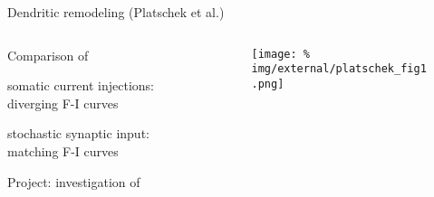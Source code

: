 
\begin{frame}{Dendritic remodeling (Platschek et al.)}
  \begin{columns}
    \begin{column}{.425\textwidth}
      \minipage[c][0.65\textheight][s]{\columnwidth}
      \vspace{0.05\textheight}

        Comparison of 

        \vfill

        somatic current injections: diverging F-I curves

        \vfill 

        stochastic synaptic input: matching F-I curves

        \vfill
        
        Project: investigation of
      
      
      
      \endminipage      
    \end{column}
    \begin{column}{.575\textwidth}
      
      \parbox[c][0.9\textheight][c]{\columnwidth}{
        \begin{figure}
          \centering
          \texttt{[image: \%
            img/external/platschek\_fig1.png]} %
        \end{figure}}
        
    \end{column}
  \end{columns}
  
\end{frame}
